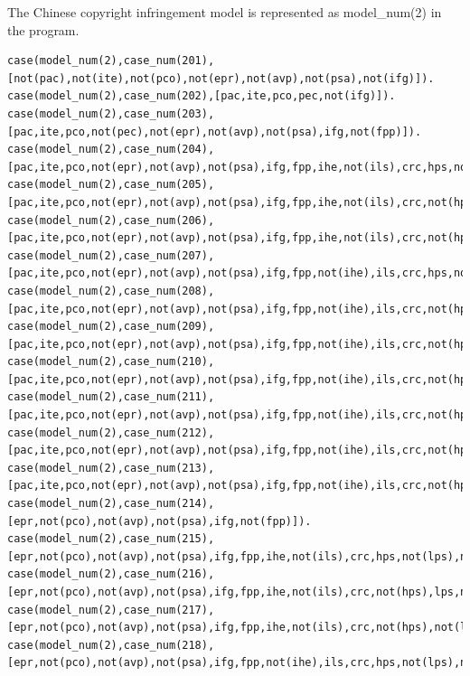 \documentclass{IOS-Book-Article}
\begin{document}
The Chinese copyright infringement model is represented as {\mf model\_num(2)} in the program. 
\begin{lstlisting}
case(model_num(2),case_num(201),[not(pac),not(ite),not(pco),not(epr),not(avp),not(psa),not(ifg)]).
case(model_num(2),case_num(202),[pac,ite,pco,pec,not(ifg)]).
case(model_num(2),case_num(203),[pac,ite,pco,not(pec),not(epr),not(avp),not(psa),ifg,not(fpp)]).
case(model_num(2),case_num(204),[pac,ite,pco,not(epr),not(avp),not(psa),ifg,fpp,ihe,not(ils),crc,hps,not(lps),not(m3fti),not(l3fti),not(cdt),not(fin)]).
case(model_num(2),case_num(205),[pac,ite,pco,not(epr),not(avp),not(psa),ifg,fpp,ihe,not(ils),crc,not(hps),lps,not(m3fti),not(l3fti),not(cdt),not(fin)]).
case(model_num(2),case_num(206),[pac,ite,pco,not(epr),not(avp),not(psa),ifg,fpp,ihe,not(ils),crc,not(hps),not(lps),m3fti,not(l3fti),not(cdt),fin]).
case(model_num(2),case_num(207),[pac,ite,pco,not(epr),not(avp),not(psa),ifg,fpp,not(ihe),ils,crc,hps,not(lps),not(m3fti),not(l3fti),not(cdt),not(fin)]).
case(model_num(2),case_num(208),[pac,ite,pco,not(epr),not(avp),not(psa),ifg,fpp,not(ihe),ils,crc,not(hps),lps,not(m3fti),not(l3fti),not(cdt),not(fin)]).
case(model_num(2),case_num(209),[pac,ite,pco,not(epr),not(avp),not(psa),ifg,fpp,not(ihe),ils,crc,not(hps),not(lps),not(m3fti),not(l3fti),not(cdt),fin]).
case(model_num(2),case_num(210),[pac,ite,pco,not(epr),not(avp),not(psa),ifg,fpp,not(ihe),ils,crc,not(hps),not(lps),not(m3fti),l3fti,not(cdt),fin,cpb,pbt]).
case(model_num(2),case_num(211),[pac,ite,pco,not(epr),not(avp),not(psa),ifg,fpp,not(ihe),ils,crc,not(hps),not(lps),not(m3fti),not(l3fti),cdt,fin,cpb,pbt]).
case(model_num(2),case_num(212),[pac,ite,pco,not(epr),not(avp),not(psa),ifg,fpp,not(ihe),ils,crc,not(hps),not(lps),not(m3fti),l3fti,not(cdt),fin,not(cpb),not(pbt)]).
case(model_num(2),case_num(213),[pac,ite,pco,not(epr),not(avp),not(psa),ifg,fpp,not(ihe),ils,crc,not(hps),not(lps),not(m3fti),not(l3fti),cdt,fin,not(cpb),not(pbt)]).
case(model_num(2),case_num(214),[epr,not(pco),not(avp),not(psa),ifg,not(fpp)]).
case(model_num(2),case_num(215),[epr,not(pco),not(avp),not(psa),ifg,fpp,ihe,not(ils),crc,hps,not(lps),not(m3fti),not(l3fti),not(cdt),not(fin)]).
case(model_num(2),case_num(216),[epr,not(pco),not(avp),not(psa),ifg,fpp,ihe,not(ils),crc,not(hps),lps,not(m3fti),not(l3fti),not(cdt),not(fin)]).
case(model_num(2),case_num(217),[epr,not(pco),not(avp),not(psa),ifg,fpp,ihe,not(ils),crc,not(hps),not(lps),m3fti,not(l3fti),not(cdt),fin]).
case(model_num(2),case_num(218),[epr,not(pco),not(avp),not(psa),ifg,fpp,not(ihe),ils,crc,hps,not(lps),not(m3fti),not(l3fti),not(cdt),not(fin)]).

\end{lstlisting}
\end{document}

